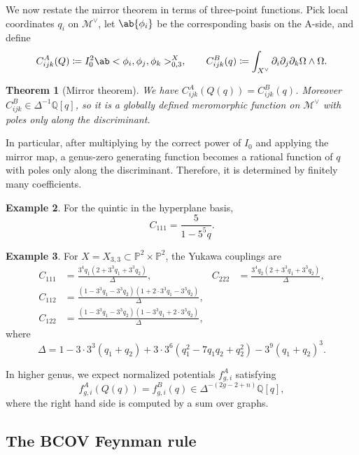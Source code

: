 \documentclass{amsart}
\newtheorem{thm}{Theorem}[section]
\theoremstyle{definition}
\newtheorem{exm}[thm]{Example}
\theoremstyle{remark}
\theoremstyle{plain}
\theoremstyle{definition}
\theoremstyle{remark}
\newcommand{\Q}{\mathbb{Q}}
\renewcommand{\P}{\mathbb{P}}
\newcommand{\mc}[1]{\mathcal{#1}}
\newcommand{\1}{\mathbf{1}}
\newcommand{\2}{\mathbf{2}}
\newcommand{\3}{\mathbf{3}}
\begin{document}
We now restate the mirror theorem in terms of three-point functions. Pick local coordinates \(q_i\) on \(\mc{M}^{\vee}\), let \(\ab\{\phi_i\}\) be the corresponding basis on the A-side, and define
\[ C^A_{ijk}(Q) \coloneqq I_0^2 \ab<\phi_i, \phi_j, \phi_k>^X_{0,3}, \qquad C^B_{ijk}(q) \coloneqq \int_{X^{\vee}} \partial_i \partial_j \partial_k \Omega \wedge \Omega. \]

\begin{thm}[Mirror theorem]
    We have \(C^A_{ijk}(Q(q)) = C^B_{ijk}(q)\). Moreover \(C^B_{ijk} \in \Delta^{-1}\Q[q]\), so it is a globally defined meromorphic function on \(\mc{M}^{\vee}\) with poles only along the discriminant.
\end{thm}

In particular, after multiplying by the correct power of \(I_0\) and applying the mirror map, a genus-zero generating function becomes a rational function of \(q\) with poles only along the discriminant. Therefore, it is determined by finitely many coefficients.

\begin{exm}
    For the quintic in the hyperplane basis,
    \[ C_{111} = \frac{5}{1-5^5 q}. \]
\end{exm}

\begin{exm}
    For \(X = X_{3,3} \subset \P^2 \times \P^2\), the Yukawa couplings are
    \begin{align*}
        C_{111} &= \frac{3^4 q_1 (2+3^3q_1+3^3q_2)}{\Delta}, & C_{222} &= \frac{3^4 q_2(2+3^3q_1+3^3q_2)}{\Delta}, \\
        C_{112} &= \frac{(1-3^3q_1-3^3q_2)(1+2\cdot 3^3 q_1 - 3^3 q_2)}{\Delta}, \\
        C_{122} &= \frac{(1-3^3q_1-3^3q_2)(1-3^3q_1+2\cdot3^3q_2)}{\Delta},
    \end{align*}
    where
    \[ \Delta = 1 - 3\cdot3^3(q_1+q_2) + 3\cdot3^6(q_1^2 - 7q_1q_2+q_2^2) - 3^9(q_1+q_2)^3. \]
\end{exm}

In higher genus, we expect normalized potentials \(f^A_{g,i}\) satisfying
\[ f^A_{g,i}(Q(q)) = f^B_{g,i}(q) \in \Delta^{-(2g-2+n)}\Q[q], \]
where the right hand side is computed by a sum over graphs.

\subsection{The BCOV Feynman rule}%
\label{sub:The BCOV Feynman rule}
\end{document}
